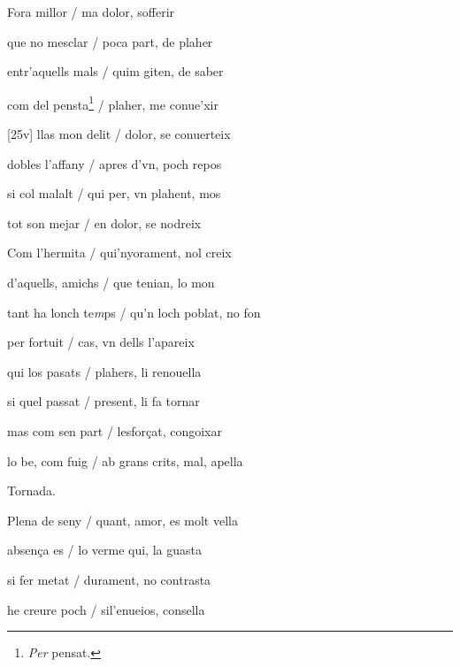 \documentclass[12pt]{article}
\begin{document}
\begin{estrofa}

 Fora millor / ma dolor, sofferir

 que no mesclar / poca part, de plaher

 entr'aquells mals / quim giten, de saber

 com del pensta\footnote{\textit{Per }pensat.} / plaher, me conue'xir

 [25v] llas mon delit / dolor, se conuerteix

 dobles l'affany / apres d'vn, poch repos

 si col malalt / qui per, vn plahent, mos

 tot son mejar / en dolor, se nodreix

\end{estrofa}



\begin{estrofa}

 Com l'hermita / qui'nyorament, nol creix

 d'aquells, amichs / que tenian, lo mon

 tant ha lonch te\textit{m}ps / qu'n loch poblat, no fon

 per fortuit / cas, vn dells l'apareix

 qui los pasats / plahers, li renouella

 si quel passat / present, li fa tornar

 mas com sen part / lesfor\c{c}at, congoixar

 lo be, com fuig / ab grans crits, mal, apella

\end{estrofa}


\begin{estrofa}%




\begin{tornada}

Tornada.

\end{tornada}


\end{estrofa}


\begin{estrofa}

 Plena de seny / quant, amor, es molt vella

 absen\c{c}a es / lo verme qui, la guasta

 si fer metat / durament, no contrasta

 he creure poch / sil'enueios, consella

\end{estrofa}
\end{document}
